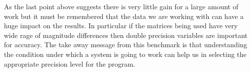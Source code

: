As the last point above suggests there is very little gain for a large amount of work but it must be remembered that the data we are working with can have a huge impact on the results. In particular if the matrices being used have very wide rage of magnitude differences then double precision variables are important for accuracy. The take away message from this benchmark is that understanding the condition under which a system is going to work can help us in selecting the appropriate precision level for the program.
